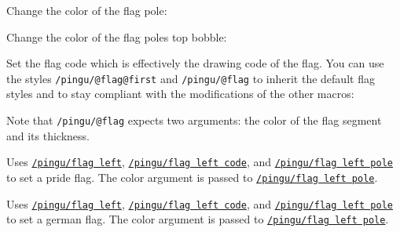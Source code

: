 \documentclass[parskip=half,english,numbers=noenddot,footnotes=nomultiple,oneside]{scrartcl}
\def\lpingu#1{\lstinline[style=lstpingu,language=pingulang]'#1'}
\newcommand*\keyref[2][/pingu/]{\hyperref[pk:#1#2]{\lpingu{#1#2}}}
\begin{document}
Change the color of the flag pole:
	\begin{tcblisting}{}
\begin{tikzpicture}
	\pingu[flag left, flag left pole=green]
\end{tikzpicture}
\end{tcblisting}
\endsubkeyexplain

Change the color of the flag poles top bobble:
	\begin{tcblisting}{}
\begin{tikzpicture}
	\pingu[flag left, flag left bobble=green]
\end{tikzpicture}
\end{tcblisting}
\endsubkeyexplain

Set the flag code which is effectively the drawing code of the flag.
You can use the styles \lpingu{/pingu/@flag@first} and \lpingu{/pingu/@flag} to inherit the default flag styles and to stay compliant with the modifications of the other macros:
	\begin{tcblisting}{}
\begin{tikzpicture}
	\pingu[flag left, flag left code={
	  \node[/pingu/@flag@first,
	  	/pingu/@flag={blue}{5mm}]
	  		(upper) at (0,0) {};
	  \node[below,/pingu/@flag={black}{4mm}]
	  	(lower) at (upper.south) {};
	}]
\end{tikzpicture}
\end{tcblisting}
Note that \lpingu{/pingu/@flag} expects two arguments: the color of the flag segment and its thickness.
\endsubkeyexplain

	Uses \keyref{flag left}, \keyref{flag left code}, and \keyref{flag left pole} to set a pride flag. The color argument is passed to \keyref{flag left pole}.
\begin{tcblisting}{}
\begin{tikzpicture}
	\pingu[pride flag left=green]
\end{tikzpicture}
\end{tcblisting}
\endkeyexplain


	Uses \keyref{flag left}, \keyref{flag left code}, and \keyref{flag left pole} to set a german flag. The color argument is passed to \keyref{flag left pole}.
\begin{tcblisting}{}
\begin{tikzpicture}
	\pingu[german flag left=green]
\end{tikzpicture}
\end{tcblisting}
\endkeyexplain
\end{document}
